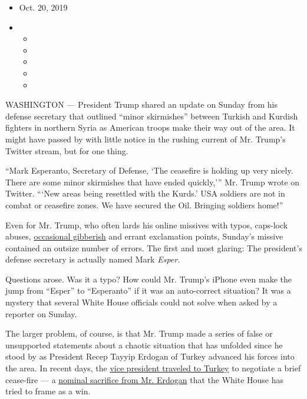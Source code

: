\begin{itemize}
\item
  Oct. 20, 2019
\item
  \begin{itemize}
  \item
  \item
  \item
  \item
  \item
  \end{itemize}
\end{itemize}

WASHINGTON --- President Trump shared an update on Sunday from his
defense secretary that outlined ``minor skirmishes'' between Turkish and
Kurdish fighters in northern Syria as American troops make their way out
of the area. It might have passed by with little notice in the rushing
current of Mr. Trump's Twitter stream, but for one thing.

``Mark Esperanto, Secretary of Defense, `The ceasefire is holding up
very nicely. There are some minor skirmishes that have ended quickly,'''
Mr. Trump wrote on Twitter. ```New areas being resettled with the
Kurds.' USA soldiers are not in combat or ceasefire zones. We have
secured the Oil. Bringing soldiers home!''

Even for Mr. Trump, who often lards his online missives with typos,
caps-lock abuses,
\href{https://www.nytimes.com/2017/05/31/us/politics/covfefe-trump-twitter.html}{occasional
gibberish} and errant exclamation points, Sunday's missive contained an
outsize number of errors. The first and most glaring: The president's
defense secretary is actually named Mark \emph{Esper.}

Questions arose. Was it a typo? How could Mr. Trump's iPhone even make
the jump from ``Esper'' to ``Esperanto'' if it was an auto-correct
situation? It was a mystery that several White House officials could not
solve when asked by a reporter on Sunday.

The larger problem, of course, is that Mr. Trump made a series of false
or unsupported statements about a chaotic situation that has unfolded
since he stood by as President Recep Tayyip Erdogan of Turkey advanced
his forces into the area. In recent days, the
\href{https://www.nytimes.com/2019/10/15/world/middleeast/pence-pompeo-turkey-syria-troops.html}{vice
president traveled to Turkey} to negotiate a brief cease-fire --- a
\href{https://www.nytimes.com/2019/10/17/world/middleeast/trump-pence-syria-turkey-ceasefire.html}{nominal
sacrifice from Mr. Erdogan} that the White House has tried to frame as a
win.

